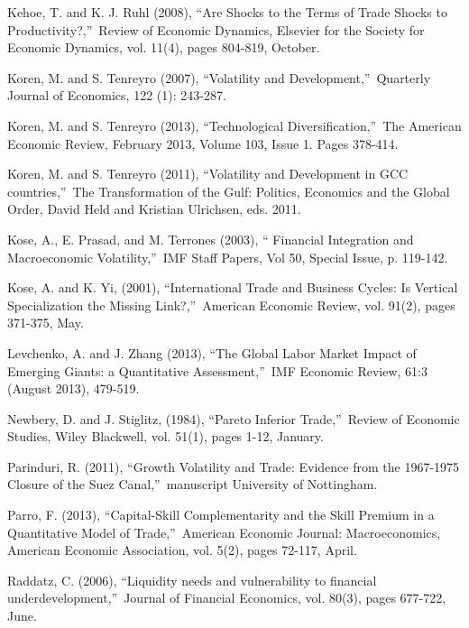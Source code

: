 \documentclass[12pt]{article}
\begin{document}
\begin{thebibliography}{99}
\bibitem{} Kehoe, T. and K. J. Ruhl (2008), \textquotedblleft Are Shocks to
the Terms of Trade Shocks to Productivity?,\textquotedblright\ Review of
Economic Dynamics, Elsevier for the Society for Economic Dynamics, vol.
11(4), pages 804-819, October.

\bibitem{} Koren, M. and S. Tenreyro (2007), \textquotedblleft Volatility
and Development,\textquotedblright\ Quarterly Journal of Economics, 122 (1):
243-287.

\bibitem{} Koren, M. and S. Tenreyro (2013), \textquotedblleft Technological
Diversification,\textquotedblright\ The American Economic Review, February
2013, Volume 103, Issue 1. Pages 378-414.

\bibitem{} Koren, M. and S. Tenreyro (2011), \textquotedblleft Volatility
and Development in GCC countries,\textquotedblright\ The Transformation of
the Gulf: Politics, Economics and the Global Order, David Held and Kristian
Ulrichsen, eds. 2011.

\bibitem{} Kose, A., E. Prasad, and M. Terrones (2003), \textquotedblleft
Financial Integration and Macroeconomic Volatility,\textquotedblright\ IMF
Staff Papers, Vol 50, Special Issue, p. 119-142.

\bibitem{} Kose, A. and K. Yi, (2001), \textquotedblleft International Trade
and Business Cycles: Is Vertical Specialization the Missing
Link?,\textquotedblright\ American Economic Review, vol. 91(2), pages
371-375, May.

\bibitem{} Levchenko, A. and J. Zhang (2013), \textquotedblleft The Global
Labor Market Impact of Emerging Giants: a Quantitative
Assessment,\textquotedblright\ IMF Economic Review, 61:3 (August 2013),
479-519.

\bibitem{} Newbery, D. and J. Stiglitz, (1984), \textquotedblleft Pareto
Inferior Trade,\textquotedblright\ Review of Economic Studies, Wiley
Blackwell, vol. 51(1), pages 1-12, January.

\bibitem{} Parinduri, R. (2011), \textquotedblleft Growth Volatility and
Trade: Evidence from the 1967-1975 Closure of the Suez
Canal,\textquotedblright\ manuscript University of Nottingham.

\bibitem{} Parro, F. (2013), \textquotedblleft Capital-Skill Complementarity
and the Skill Premium in a Quantitative Model of Trade,\textquotedblright\
American Economic Journal: Macroeconomics, American Economic Association,
vol. 5(2), pages 72-117, April.

\bibitem{} Raddatz, C. (2006), \textquotedblleft Liquidity needs and
vulnerability to financial underdevelopment,\textquotedblright\ Journal of
Financial Economics, vol. 80(3), pages 677-722, June.


\end{thebibliography}
\end{document}
